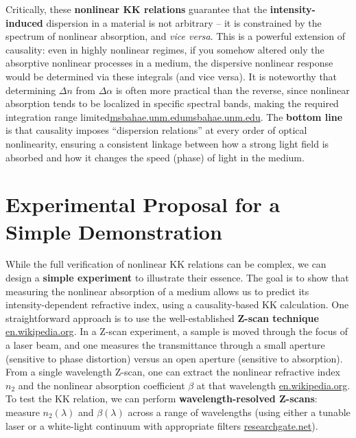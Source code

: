 \documentclass[11pt,a4paper]{article}
\begin{document}
Critically, these \textbf{nonlinear KK relations} guarantee that the \textbf{intensity-induced} dispersion in a material is not arbitrary – it is constrained by the spectrum of nonlinear absorption, and \emph{vice versa}. This is a powerful extension of causality: even in highly nonlinear regimes, if you somehow altered only the absorptive nonlinear processes in a medium, the dispersive nonlinear response would be determined via these integrals (and vice versa). It is noteworthy that determining $\Delta n$ from $\Delta \alpha$ is often more practical than the reverse, since nonlinear absorption tends to be localized in specific spectral bands, making the required integration range limited\href{https://msbahae.unm.edu/Courses/568%20Nonlinear%20Optics/OSA-Handbook%20of%20Optics-IV-Ch17.pdf#:~:text=data obtained in nonlinear optics,based on the linear absorption}{msbahae.unm.edu}\href{https://msbahae.unm.edu/Courses/568%20Nonlinear%20Optics/OSA-Handbook%20of%20Optics-IV-Ch17.pdf#:~:text=account of the entire linear,over a relatively broad frequency}{msbahae.unm.edu}. The \textbf{bottom line} is that causality imposes “dispersion relations” at every order of optical nonlinearity, ensuring a consistent linkage between how a strong light field is absorbed and how it changes the speed (phase) of light in the medium.

\section{Experimental Proposal for a Simple Demonstration}

While the full verification of nonlinear KK relations can be complex, we can design a \textbf{simple experiment} to illustrate their essence. The goal is to show that measuring the nonlinear absorption of a medium allows us to predict its intensity-dependent refractive index, using a causality-based KK calculation. One straightforward approach is to use the well-established \textbf{Z-scan technique} \href{https://en.wikipedia.org/wiki/Z-scan_technique}{en.wikipedia.org}. In a Z-scan experiment, a sample is moved through the focus of a laser beam, and one measures the transmittance through a small aperture (sensitive to phase distortion) versus an open aperture (sensitive to absorption). From a single wavelength Z-scan, one can extract the nonlinear refractive index $n_2$ and the nonlinear absorption coefficient $\beta$ at that wavelength \href{https://en.wikipedia.org/wiki/Z-scan_technique}{en.wikipedia.org}. To test the KK relation, we can perform \textbf{wavelength-resolved Z-scans}: measure $n_2(\lambda)$ and $\beta(\lambda)$ across a range of wavelengths (using either a tunable laser or a white-light continuum with appropriate filters \href{https://www.researchgate.net/publication/26265633_Dispersion_of_nonlinear_refraction_and_two-photon_absorption_using_a_white-light_continuum_Z-scan}{researchgate.net}).
\end{document}
